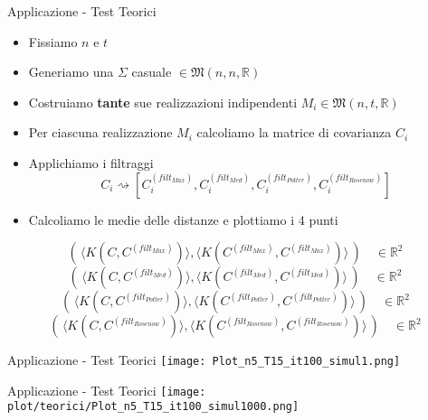 \documentclass{beamer}
\newcommand{\bbR}{\mathbb{R}}
\newcommand{\1}{\mathbbm{1}}
\begin{document}



\begin{frame}{Applicazione - Test Teorici}
\begin{itemize}
\item Fissiamo $n$ e $t$
\pause
\item Generiamo una $\Sigma$ casuale $\in\mathfrak{M}(n,n,\bbR)$
\pause
\item Costruiamo \textbf{tante} sue realizzazioni indipendenti $M_i\in\mathfrak{M}(n,t,\bbR)$ 
\pause
\item Per ciascuna realizzazione $M_i$ calcoliamo la matrice di covarianza $C_i$
\pause
\item Applichiamo i filtraggi 
\[C_i \rightsquigarrow \left[C^{(filt_{Max})}_i,C^{(filt_{Med})}_i,C^{(filt_{Potter})}_i,C^{(filt_{Rosenow})}_i\right]\]
\pause
\item Calcoliamo le medie delle distanze e plottiamo i 4 punti
\end{itemize}
\[
\left(\, \langle K(C,C^{(filt_{Max})})\rangle , \langle K(C^{(filt_{Max})},C^{(filt_{Max})})\rangle \,\right) \quad\in\bbR^2
\]
\[
\left(\, \langle K(C,C^{(filt_{Med})})\rangle , \langle K(C^{(filt_{Med})},C^{(filt_{Med})})\rangle \,\right) \quad\in\bbR^2
\]
\[
\left(\, \langle K(C,C^{(filt_{Potter})})\rangle , \langle K(C^{(filt_{Potter})},C^{(filt_{Potter})})\rangle \,\right) \quad\in\bbR^2
\]
\[
\left(\, \langle K(C,C^{(filt_{Rosenow})})\rangle , \langle K(C^{(filt_{Rosenow})},C^{(filt_{Rosenow})})\rangle \,\right) \quad\in\bbR^2
\]
\end{frame}

\begin{frame}{Applicazione - Test Teorici}
\centering\texttt{[image: Plot\_n5\_T15\_it100\_simul1.png]}
\end{frame}

\begin{frame}{Applicazione - Test Teorici}
\centering\texttt{[image: plot/teorici/Plot\_n5\_T15\_it100\_simul1000.png]}
\end{frame}
\end{document}
